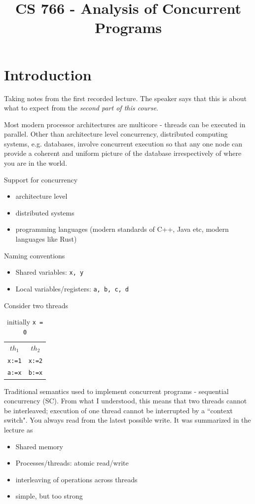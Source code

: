 \documentclass[a4paper]{article}
\title{CS 766 - Analysis of Concurrent Programs}
\begin{document}
\section{Introduction}
Taking notes from the first recorded lecture. The speaker says that
this is about what to expect from the \textit{second  part of this course}.

Most modern processor architectures are multicore - threads can be
executed in parallel. Other than architecture level concurrency,
distributed computing systems, e.g. databases, involve concurrent
execution so that any one node can provide a coherent and uniform
picture of the database irrespectively of where you are in the world.

Support for concurrency
\begin{itemize}
	\item architecture level
	\item distributed systems
	\item programming languages (modern standards of C++, Java etc, modern languages like Rust)
\end{itemize}

Naming conventions
\begin{itemize}
	\item Shared variables: \texttt{x, y}
	\item Local variables/registers: \texttt{a, b, c, d}
\end{itemize}

Consider two threads 
\begin{table}[h]
	\centering
	\caption{initially \texttt{x = 0}}
	\label{tab:ex1}
	\begin{tabular}{c || c}
		$th_1$ & $th_2$ \\
		\texttt{x:=1} & \texttt{x:=2} \\
		\texttt{a:=x} & \texttt{b:=x}
	\end{tabular}
\end{table}

Traditional semantics used to implement concurrent programs - sequential
concurrency (SC). From what I understood, this means that two threads
cannot be interleaved; execution of one thread cannot be interrupted
by a ``context switch".
You always read from the latest possible write. It was summarized in the
lecture as
\begin{itemize}
	\item Shared memory
	\item Processes/threads: atomic read/write
	\item interleaving of operations across threads
	\item simple, but too strong
\end{itemize}
\end{document}
